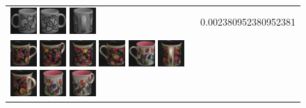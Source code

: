 {\begin{figure}[p]
\begin{tabular}{m{11cm} | m{3cm} |}
\includegraphics[width=1cm]{coil/beeld-51.eps}
\includegraphics[width=1cm]{coil/beeld-48.eps}
\includegraphics[width=1cm]{coil/beeld-50.eps}
& {\scriptsize 0.002380952380952381}
\\
\includegraphics[width=1cm]{coil/beeld-60.eps}
\includegraphics[width=1cm]{coil/beeld-63.eps}
\includegraphics[width=1cm]{coil/beeld-62.eps}
\includegraphics[width=1cm]{coil/beeld-61.eps}
\includegraphics[width=1cm]{coil/beeld-7.eps}
\includegraphics[width=1cm]{coil/beeld-65.eps}
\includegraphics[width=1cm]{coil/beeld-64.eps}
\includegraphics[width=1cm]{coil/beeld-8.eps}
\includegraphics[width=1cm]{coil/beeld-9.eps}

\end{tabular}
\end{figure}}
